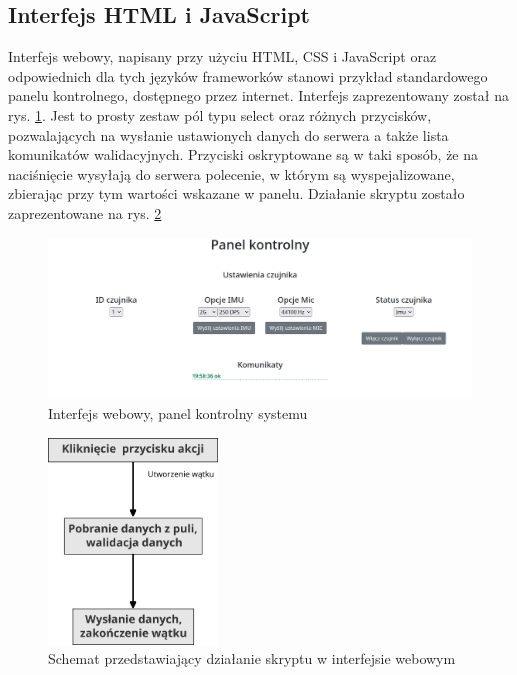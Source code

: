 \documentclass[12pt,oneside,a4paper]{book}
\theoremstyle{break}
\begin{document}
\subsection{Interfejs HTML i JavaScript}
Interfejs webowy, napisany przy użyciu HTML, CSS i JavaScript oraz
odpowiednich dla tych języków frameworków stanowi przykład standardowego
panelu kontrolnego, dostępnego przez internet. Interfejs
zaprezentowany został na rys. \ref{rys:web-interface}.
Jest to prosty zestaw pól typu select oraz różnych przycisków, 
pozwalających na wysłanie ustawionych danych do serwera
a także lista komunikatów walidacyjnych. Przyciski oskryptowane
są w taki sposób, że na naciśnięcie wysyłają do serwera polecenie,
w którym są wyspejalizowane, zbierając przy tym wartości 
wskazane w panelu. Działanie skryptu zostało zaprezentowane 
na rys. \ref{rys:frontend-script-schema}

\begin{figure}[H]
    \begin{center}
        \includegraphics[width=\textwidth]{interfejs_webowy.png}
        \caption{Interfejs webowy, panel kontrolny systemu}        
        \label{rys:web-interface}
    \end{center}
\end{figure}

\begin{figure}[H]
    \begin{center}
        \includegraphics[width=0.4\textwidth]{schemat_interfejsu_webowego.png}
        \caption{Schemat przedstawiający działanie skryptu w interfejsie webowym}        
        \label{rys:frontend-script-schema}
    \end{center}
\end{figure}
\end{document}
